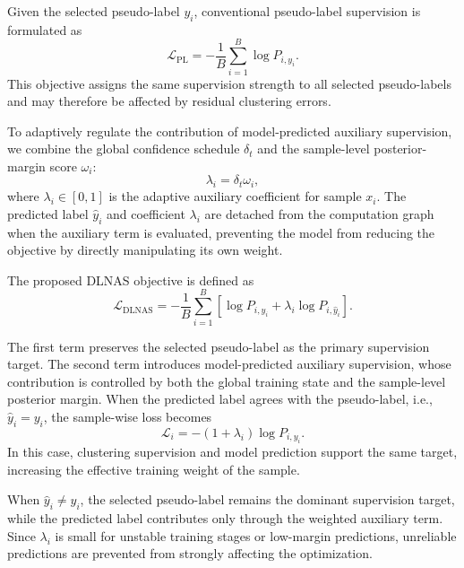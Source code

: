 \documentclass[journal]{IEEEtran}
\begin{document}
Given the selected pseudo-label $y_i$, conventional pseudo-label supervision is formulated as
\begin{equation}
\mathcal{L}_{\mathrm{PL}}
=
-\frac{1}{B}
\sum_{i=1}^{B}
\log P_{i,y_i}.
\end{equation}
This objective assigns the same supervision strength to all selected pseudo-labels and may therefore be affected by residual clustering errors.

To adaptively regulate the contribution of model-predicted auxiliary supervision, we combine the global confidence schedule $\delta_t$ and the sample-level posterior-margin score $\omega_i$:
\begin{equation}
\lambda_i
=
\delta_t\omega_i,
\end{equation}
where $\lambda_i\in[0,1]$ is the adaptive auxiliary coefficient for sample $x_i$.
The predicted label $\hat{y}_i$ and coefficient $\lambda_i$ are detached from
the computation graph when the auxiliary term is evaluated, preventing the
model from reducing the objective by directly manipulating its own weight.

The proposed DLNAS objective is defined as
\begin{equation}
\mathcal{L}_{\mathrm{DLNAS}}
=
-\frac{1}{B}
\sum_{i=1}^{B}
\left[
\log P_{i,y_i}
+
\lambda_i\log P_{i,\hat{y}_i}
\right].
\end{equation}

The first term preserves the selected pseudo-label as the primary supervision target.
The second term introduces model-predicted auxiliary supervision, whose contribution is controlled by both the global training state and the sample-level posterior margin.
When the predicted label agrees with the pseudo-label, i.e., $\hat{y}_i=y_i$, the sample-wise loss becomes
\begin{equation}
\mathcal{L}_i
=
-(1+\lambda_i)\log P_{i,y_i}.
\end{equation}
In this case, clustering supervision and model prediction support the same target, increasing the effective training weight of the sample.

When $\hat{y}_i\neq y_i$, the selected pseudo-label remains the dominant supervision target, while the predicted label contributes only through the weighted auxiliary term.
Since $\lambda_i$ is small for unstable training stages or low-margin predictions, unreliable predictions are prevented from strongly affecting the optimization.
\end{document}
